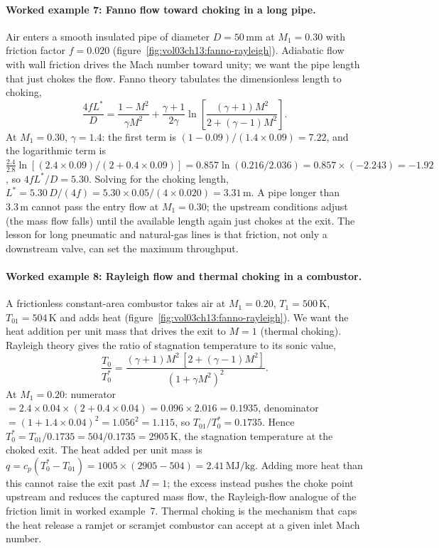 \paragraph{Worked example 7: Fanno flow toward choking in a long pipe.}
Air enters a smooth insulated pipe of diameter $D = 50\,\si{\milli
\meter}$ at $M_1 = 0.30$ with friction factor $f = 0.020$
(figure~\ref{fig:vol03ch13:fanno-rayleigh}). Adiabatic flow with wall
friction drives the Mach number toward unity; we want the pipe length
that just chokes the flow. Fanno theory tabulates the dimensionless
length to choking,
\[
\frac{4 f L^*}{D} = \frac{1 - M^2}{\gamma M^2}
+ \frac{\gamma + 1}{2\gamma}\ln\!\left[\frac{(\gamma + 1)M^2}
{2 + (\gamma - 1)M^2}\right].
\]
At $M_1 = 0.30$, $\gamma = 1.4$: the first term is
$(1 - 0.09)/(1.4\times 0.09) = 7.22$, and the logarithmic term is
$\frac{2.4}{2.8}\ln[(2.4\times 0.09)/(2 + 0.4\times 0.09)] =
0.857\ln(0.216/2.036) = 0.857\times(-2.243) = -1.92$, so
$4fL^*/D = 5.30$. Solving for the choking length,
$L^* = 5.30\,D/(4f) = 5.30\times 0.05/(4\times 0.020) =
3.31\,\si{\meter}$. A pipe longer than $3.3\,\si{\meter}$ cannot pass
the entry flow at $M_1 = 0.30$; the upstream conditions adjust (the
mass flow falls) until the available length again just chokes at the
exit. The lesson for long pneumatic and natural-gas lines is that
friction, not only a downstream valve, can set the maximum throughput.

\paragraph{Worked example 8: Rayleigh flow and thermal choking in a
combustor.} A frictionless constant-area combustor takes air at
$M_1 = 0.20$, $T_1 = 500\,\si{\kelvin}$, $T_{01} = 504\,\si{\kelvin}$
and adds heat (figure~\ref{fig:vol03ch13:fanno-rayleigh}). We want the
heat addition per unit mass that drives the exit to $M = 1$ (thermal
choking). Rayleigh theory gives the ratio of stagnation temperature to
its sonic value,
\[
\frac{T_0}{T_0^*} = \frac{(\gamma + 1)M^2\,[2 + (\gamma - 1)M^2]}
{(1 + \gamma M^2)^2}.
\]
At $M_1 = 0.20$: numerator $= 2.4\times 0.04\times(2 + 0.4\times 0.04)
= 0.096\times 2.016 = 0.1935$, denominator $= (1 + 1.4\times 0.04)^2 =
1.056^2 = 1.115$, so $T_{01}/T_0^* = 0.1735$. Hence
$T_0^* = T_{01}/0.1735 = 504/0.1735 = 2905\,\si{\kelvin}$, the
stagnation temperature at the choked exit. The heat added per unit
mass is $q = c_p(T_0^* - T_{01}) = 1005\times(2905 - 504) =
2.41\,\si{\mega\joule\per\kilogram}$. Adding more heat than this cannot
raise the exit past $M = 1$; the excess instead pushes the choke point
upstream and reduces the captured mass flow, the Rayleigh-flow analogue
of the friction limit in worked example~7. Thermal choking is the
mechanism that caps the heat release a ramjet or scramjet combustor can
accept at a given inlet Mach number.

